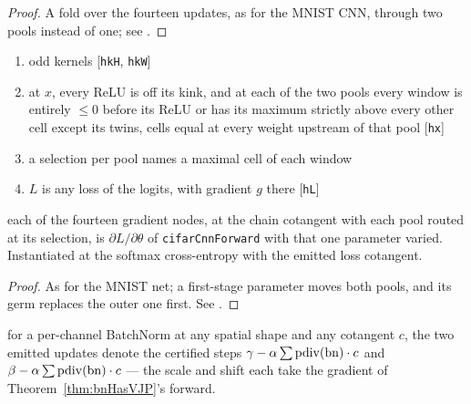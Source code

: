 \begin{proof}
\leanok
A fold over the fourteen updates, as for the MNIST CNN, through two pools
instead of one; see
.
\end{proof}

\begin{theorem}
  \label{thm:cifar_loss_grad}
  \leanok
  \Assume{}
  \begin{enumerate}
    \item odd kernels \hfill[\texttt{hkH}, \texttt{hkW}]
    \item at \(x\), every ReLU is off its kink, and at each of the two pools
          every window is entirely \(\le 0\) before its ReLU or has its
          maximum strictly above every other cell except its twins, cells
          equal at every weight upstream of that pool \hfill[\texttt{hx}]
    \item a selection per pool names a maximal cell of each window
    \item \(L\) is any loss of the logits, with gradient \(g\) there
          \hfill[\texttt{hL}]
  \end{enumerate}
  \Prove{} each of the fourteen gradient nodes, at the chain cotangent with
  each pool routed at its selection, is \(\partial L/\partial\theta\) of
  \texttt{cifarCnnForward} with that one parameter varied. Instantiated at
  the softmax cross-entropy with the emitted loss cotangent.
\end{theorem}

\begin{proof}
\leanok
As for the MNIST net; a first-stage parameter moves both pools, and its germ
replaces the outer one first. See
.
\end{proof}

\begin{theorem}
  \label{thm:cifar_bn_fold}
  \leanok
  \Prove{} for a per-channel BatchNorm at any spatial shape and any
  cotangent \(c\), the two emitted updates denote the certified steps
  \(\gamma - \alpha \sum \operatorname{pdiv}(\mathrm{bn})\cdot c\) and
  \(\beta - \alpha \sum \operatorname{pdiv}(\mathrm{bn})\cdot c\) --- the scale and shift each
  take the gradient of Theorem~\ref{thm:bnHasVJP}'s forward.
\end{theorem}

